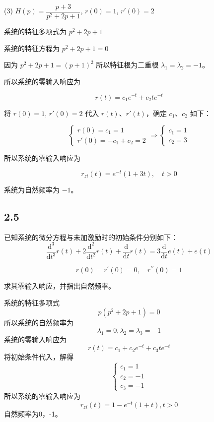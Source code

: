 \documentclass[UTF8]{ctexart}
\begin{document}
\begin{solution}
\bigskip

(3) $H(p)=\dfrac{p+3}{p^2+2p+1}$, $r(0)=1$, $r'(0)=2$

系统的特征多项式为 $p^2+2p+1$

系统的特征方程为 $p^2+2p+1=0$

因为 $p^2+2p+1=(p+1)^2$ 所以特征根为二重根 $\lambda_1=\lambda_2=-1$。

所以系统的零输入响应为

$$
r(t)=c_1 e^{-t}+c_2 t e^{-t}
$$

将 $r(0)=1$, $r'(0)=2$ 代入 $r(t)$、$r'(t)$，确定 $c_1$、$c_2$ 如下：

$$
\begin{cases} r(0)=c_1=1 \\ r'(0)=-c_1+c_2=2 \end{cases} \Rightarrow \begin{cases} c_1=1 \\ c_2=3 \end{cases}
$$

所以系统的零输入响应为

$$
r_{zi}(t)=e^{-t}(1+3t), \quad t>0
$$

系统为自然频率为 $-1$。
\end{solution}

\subsection{2.5}

\begin{problem}
已知系统的微分方程与未加激励时的初始条件分别如下：
$$
\frac{\mathrm{d}^3}{\mathrm{d}t^3}r(t)+2\frac{\mathrm{d}^2}{\mathrm{d}t^2}r(t)+\frac{\mathrm{d}}{\mathrm{d}t}r(t)=3\frac{\mathrm{d}}{\mathrm{d}t}e(t)+e(t)
$$

$$
r(0)=r^\prime(0)=0,\quad r^{\prime\prime}(0)=1
$$

求其零输入响应，并指出自然频率。
\end{problem}

\begin{solution}
系统的特征多项式
$$
p\left(p^2+2p+1\right)=0
$$
所以系统的自然频率为
$$
\lambda_1=0, \lambda_2=\lambda_3=-1
$$
系统的零输入响应为
$$
r(t)=c_1+c_2e^{-t}+c_3te^{-t}
$$
将初始条件代入，解得
$$
\begin{cases}
c_1=1 \\
c_2 = -1 \\
c_3 = -1
\end{cases}
$$
所以系统的零输入响应为
$$
r_{zi}(t)=1-e^{-t}(1+t), t>0
$$
自然频率为0，-1。
\end{solution}
\end{document}
